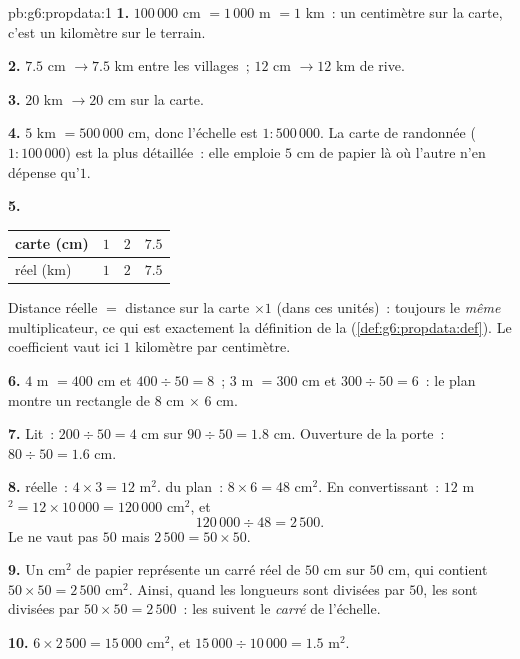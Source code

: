 \begin{solution}{pb:g6:propdata:1}
\textbf{1.} $100\,000$ cm $= 1\,000$ m $= 1$ km~: un centimètre sur
la carte, c'est un kilomètre sur le terrain.

\textbf{2.} $7.5$ cm $\rightarrow 7.5$ km entre les villages~;
$12$ cm $\rightarrow 12$ km de rive.

\textbf{3.} $20$ km $\rightarrow 20$ cm sur la carte.

\textbf{4.} $5$ km $= 500\,000$ cm, donc l'échelle est
$1:500\,000$. La carte de randonnée ($1:100\,000$) est la plus
détaillée~: elle emploie $5$ cm de papier là où l'autre n'en dépense
qu'$1$.

\textbf{5.}
\begin{center}
\renewcommand{\arraystretch}{1.2}
\begin{tabular}{l|ccc}
carte (cm) & $1$ & $2$ & $7.5$ \\
\hline
réel (km) & $1$ & $2$ & $7.5$ \\
\end{tabular}
\end{center}
Distance réelle $=$ distance sur la carte $\times 1$ (dans ces
unités)~: toujours le \emph{même} multiplicateur, ce qui est
exactement la définition de la 
(\cref{def:g6:propdata:def}). Le coefficient vaut ici $1$ kilomètre
par centimètre.

\textbf{6.} $4$ m $= 400$ cm et $400 \div 50 = 8$~;
$3$ m $= 300$ cm et $300 \div 50 = 6$~: le plan montre un rectangle
de $8$ cm $\times$ $6$ cm.

\textbf{7.} Lit~: $200 \div 50 = 4$ cm sur $90 \div 50 = 1.8$ cm.
Ouverture de la porte~: $80 \div 50 = 1.6$ cm.

\textbf{8.}  réelle~: $4 \times 3 = 12$ m$^2$.  du plan~:
$8 \times 6 = 48$ cm$^2$. En convertissant~:
$12$ m$^2 = 12 \times 10\,000 = 120\,000$ cm$^2$, et
\[
120\,000 \div 48 = 2\,500 .
\]
Le  ne vaut pas $50$ mais $2\,500 = 50 \times 50$.

\textbf{9.} Un cm$^2$ de papier représente un carré réel de $50$ cm
sur $50$ cm, qui contient $50 \times 50 = 2\,500$ cm$^2$. Ainsi,
quand les longueurs sont divisées par $50$, les  sont divisées
par $50 \times 50 = 2\,500$~: les  suivent le \emph{carré} de
l'échelle.

\textbf{10.} $6 \times 2\,500 = 15\,000$ cm$^2$, et
$15\,000 \div 10\,000 = 1.5$ m$^2$.


\end{solution}
